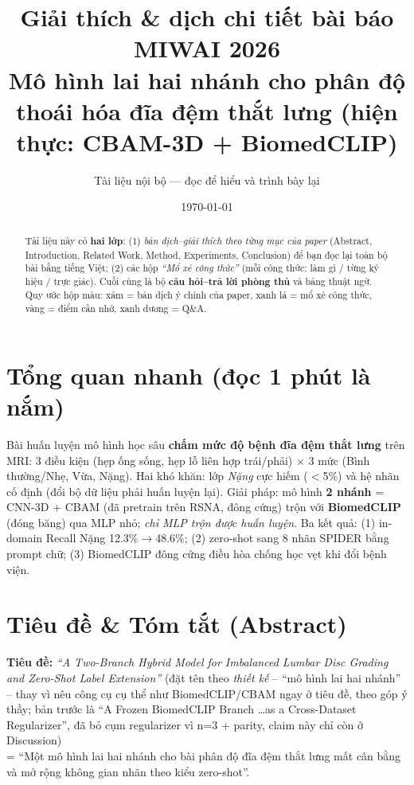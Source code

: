 \documentclass[12pt,a4paper]{article}
\title{\textbf{Giải thích \& dịch chi tiết bài báo MIWAI 2026}\\[4pt]
\large Mô hình lai hai nhánh cho phân độ thoái hóa đĩa đệm thắt lưng (hiện thực: CBAM-3D + BiomedCLIP)}
\author{Tài liệu nội bộ --- đọc để hiểu và trình bày lại}
\date{\today}
\begin{document}
\maketitle

\begin{abstract}
\noindent Tài liệu này có \textbf{hai lớp}: (1) \emph{bản dịch--giải thích theo từng mục của paper} (Abstract, Introduction, Related Work, Method, Experiments, Conclusion) để bạn đọc lại toàn bộ bài bằng tiếng Việt; (2) các hộp \emph{``Mổ xẻ công thức''} (mỗi công thức: làm gì / từng ký hiệu / trực giác). Cuối cùng là bộ \textbf{câu hỏi--trả lời phòng thủ} và bảng thuật ngữ. Quy ước hộp màu: \colorbox{gray!12}{xám = bản dịch ý chính của paper}, \colorbox{green!10}{xanh lá = mổ xẻ công thức}, \colorbox{yellow!15}{vàng = điểm cần nhớ}, \colorbox{blue!8}{xanh dương = Q\&A}.
\end{abstract}

\tableofcontents
\newpage

\section{Tổng quan nhanh (đọc 1 phút là nắm)}
Bài huấn luyện mô hình học sâu \textbf{chấm mức độ bệnh đĩa đệm thắt lưng} trên MRI: 3 điều kiện (hẹp ống sống, hẹp lỗ liên hợp trái/phải) $\times$ 3 mức (Bình thường/Nhẹ, Vừa, Nặng). Hai khó khăn: lớp \emph{Nặng} cực hiếm ($<$5\%) và hệ nhãn cố định (đổi bộ dữ liệu phải huấn luyện lại). Giải pháp: mô hình \textbf{2 nhánh} = CNN-3D + CBAM (đã pretrain trên RSNA, đông cứng) trộn với \textbf{BiomedCLIP} (đóng băng) qua MLP nhỏ; \emph{chỉ MLP trộn được huấn luyện}. Ba kết quả: (1) in-domain Recall Nặng 12.3\%$\to$48.6\%; (2) zero-shot sang 8 nhãn SPIDER bằng prompt chữ; (3) BiomedCLIP đông cứng điều hòa chống học vẹt khi đổi bệnh viện.

\section{Tiêu đề \& Tóm tắt (Abstract)}

\textbf{Tiêu đề:} \emph{``A Two-Branch Hybrid Model for Imbalanced Lumbar Disc Grading and Zero-Shot Label Extension''} (đặt tên theo \emph{thiết kế} -- ``mô hình lai hai nhánh'' -- thay vì nêu công cụ cụ thể như BiomedCLIP/CBAM ngay ở tiêu đề, theo góp ý thầy; bản trước là ``A Frozen BiomedCLIP Branch \dots as a Cross-Dataset Regularizer'', đã bỏ cụm regularizer vì n=3 + parity, claim này chỉ còn ở Discussion)
\\ = ``Một mô hình lai hai nhánh cho bài phân độ đĩa đệm thắt lưng mất cân bằng và mở rộng không gian nhãn theo kiểu zero-shot''.
\end{document}
